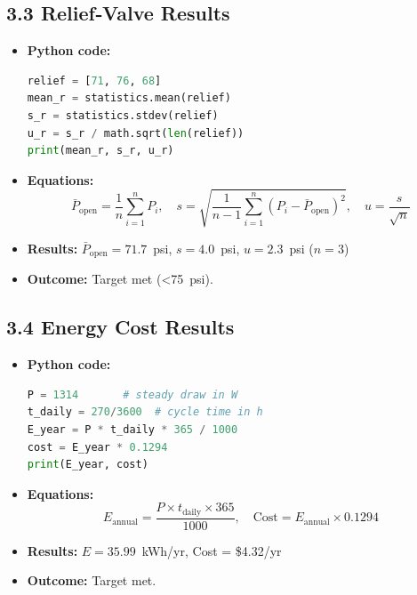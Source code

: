 \documentclass[12pt]{article}
\begin{document}
\subsection*{3.3\; Relief‑Valve Results}
\begin{itemize}[leftmargin=*]
  \item \textbf{Python code:}
    \begin{lstlisting}[language=Python]
relief = [71, 76, 68]
mean_r = statistics.mean(relief)
s_r = statistics.stdev(relief)
u_r = s_r / math.sqrt(len(relief))
print(mean_r, s_r, u_r)
    \end{lstlisting}
  \item \textbf{Equations:}
    \[
      \bar P_{\mathrm{open}} = \frac{1}{n}\sum_{i=1}^n P_i,\quad
      s = \sqrt{\frac{1}{n-1}\sum_{i=1}^n (P_i - \bar P_{\mathrm{open}})^2},\quad
      u = \frac{s}{\sqrt{n}}
    \]
  \item \textbf{Results:} $\bar P_{\mathrm{open}} = 71.7$ psi, $s = 4.0$ psi, $u = 2.3$ psi ($n=3$)
  \item \textbf{Outcome:} Target met (<75 psi).
\end{itemize}

\subsection*{3.4\; Energy Cost Results}
\begin{itemize}[leftmargin=*]
  \item \textbf{Python code:}
    \begin{lstlisting}[language=Python]
P = 1314       # steady draw in W
t_daily = 270/3600  # cycle time in h
E_year = P * t_daily * 365 / 1000
cost = E_year * 0.1294
print(E_year, cost)
    \end{lstlisting}
  \item \textbf{Equations:}
    \[
      E_{\mathrm{annual}}
        = \frac{P \times t_{\mathrm{daily}} \times 365}{1000},\quad
      \text{Cost}
        = E_{\mathrm{annual}} \times 0.1294
    \]
  \item \textbf{Results:} $E = 35.99$ kWh/yr, Cost = \$4.32/yr
  \item \textbf{Outcome:} Target met.
\end{itemize}
\end{document}
